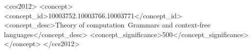 
\begin{CCSXML}
	<ccs2012>
	<concept>
	<concept_id>10003752.10003766.10003771</concept_id>
	<concept_desc>Theory of computation~Grammars and context-free languages</concept_desc>
	<concept_significance>500</concept_significance>
	</concept>
	</ccs2012>
\end{CCSXML}


\printccsdesc

